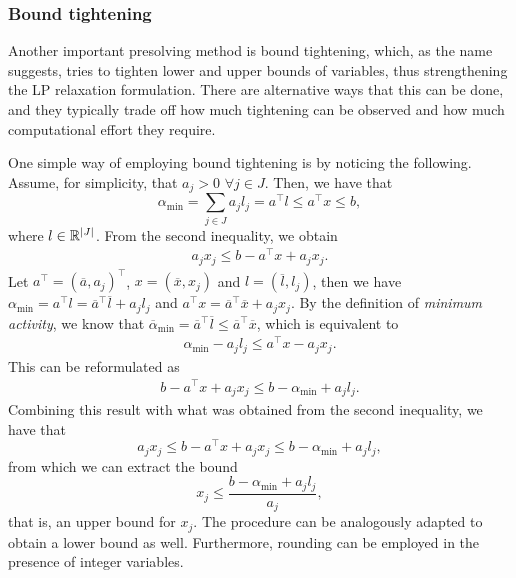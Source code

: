 \subsubsection{Bound tightening}

Another important presolving method is bound tightening, which, as the name suggests, tries to tighten lower and upper bounds of variables, thus strengthening the LP relaxation formulation. There are alternative ways that this can be done, and they typically trade off how much tightening can be observed and how much computational effort they require. 

One simple way of employing bound tightening is by noticing the following. Assume, for simplicity, that $a_j > 0$ $\forall j \in J$. Then, we have that
%
\begin{equation*}
	\alpha_{\text{min}} = \sum_{j \in J}a_jl_j = a^\top l \le a^\top x \le b,
\end{equation*}
%
where $l \in \mathbb{R}^{|J|}$.
From the second inequality, we obtain 
%
\begin{align*}
    a_jx_j \le b - a^\top x + a_jx_j.
\end{align*}
%
Let $a^\top = (\overline{a}, a_j)^\top$, $x = (\overline{x}, x_j)$ and $l = (\overline{l}, l_j)$, then we have $\alpha_{\text{min}} = a^\top l = \overline{a}^\top \overline{l} + a_j l_j$ and $a^\top x = \overline{a}^\top \overline{x} + a_j x_j$. By the definition of \emph{minimum activity}, we know that $\overline{\alpha}_{\text{min}} = \overline{a}^\top \overline{l} \le \overline{a}^\top \overline{x}$, which is equivalent to 
%
\begin{align*}
    \alpha_{\text{min}} - a_jl_j \le a^\top x - a_jx_j.
\end{align*}
%
This can be reformulated as 
%
\begin{align*}
    b - a^\top x + a_jx_j \le b - \alpha_{\text{min}} + a_jl_j.
\end{align*}
%
Combining this result with what was obtained from the second inequality, we have that
\begin{equation*}
	 a_jx_j \le b - a^\top x + a_jx_j \le b - \alpha_{\text{min}} + a_jl_j,
\end{equation*}
%
from which we can extract the bound
%
\begin{equation*}
	x_j \leq \frac{b - \alpha_{\text{min}} + a_jl_j}{a_j},
\end{equation*}
%
that is, an upper bound for $x_j$. The procedure can be analogously adapted to obtain a lower bound as well. Furthermore, rounding can be employed in the presence of integer variables. 

